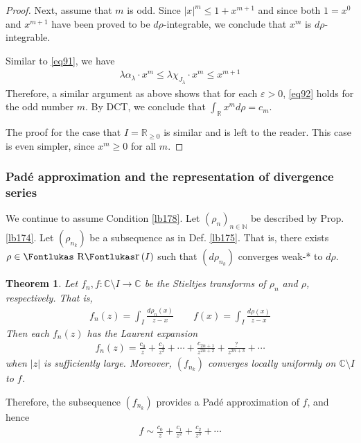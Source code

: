 \documentclass[12pt,b5paper,notitlepage]{article}
\theoremstyle{definition}
\theoremstyle{plain}
\newtheorem{thm}[df]{Theorem}
\DeclareMathOperator{\Rr}{\text{\Fontlukas R}\text{\kern -0pt {\Fontlukas\large r}}\,}
\newcommand{\Cbb}{\mathbb C}
\newcommand{\Nbb}{\mathbb N}
\newcommand{\Rbb}{\mathbb R}
\newcommand{\eps}{\varepsilon}
\numberwithin{equation}{section}
\begin{document}
\begin{proof}
Next, assume that $m$ is odd. Since $|x|^m\leq 1+x^{m+1}$ and since both $1=x^0$ and $x^{m+1}$ have been proved to be $d\rho$-integrable, we conclude that $x^m$ is $d\rho$-integrable.

Similar to \eqref{eq91}, we have
\begin{align*}
\lambda\alpha_\lambda\cdot x^m\leq \lambda\chi_{J_\lambda}\cdot x^m\leq x^{m+1}
\end{align*}
Therefore, a similar argument as above shows that for each $\eps>0$, \eqref{eq92} holds for the odd number $m$. By DCT, we conclude that $\int_\Rbb x^md\rho=c_m$.

The proof for the case that $I=\Rbb_{\geq0}$ is similar and is left to the reader. This case is even simpler, since $x^m\geq0$ for all $m$.
\end{proof}




\subsubsection{Pad\'e approximation and the representation of divergence series}


We continue to assume Condition \ref{lb178}. Let $(\rho_n)_{n\in\Nbb}$ be described by Prop. \ref{lb174}. Let $(\rho_{n_k})$ be a subsequence as in Def. \ref{lb175}. That is, there exists $\rho\in\Rr(I)$ such that $(d\rho_{n_k})$ converges weak-* to $d\rho$.


\begin{thm}\label{lb183}
Let $f_n,f:\Cbb\setminus I\rightarrow\Cbb$ be the Stieltjes transforms of $\rho_n$ and $\rho$, respectively. That is,
\begin{gather*}
f_n(z)=\int_I\frac{d\rho_n(x)}{z-x}\qquad f(x)=\int_I\frac{d\rho(x)}{z-x}
\end{gather*}
Then each $f_n(z)$ has the Laurent expansion
\begin{align}\label{eq99}
f_n(z)=\frac{c_0}{z}+\frac{c_1}{z^2}+\cdots+\frac{c_{2n+1}}{z^{2n+2}}+\frac{?}{z^{2n+3}}+\cdots
\end{align}
when $|z|$ is sufficiently large. Moreover, $(f_{n_k})$ converges locally uniformly on $\Cbb\setminus I$ to $f$.
\end{thm}


Therefore, the subsequence $(f_{n_k})$ provides a Pad\'e approximation of $f$, and hence
\begin{align*}
f\sim \frac{c_0}{z}+\frac{c_1}{z^2}+\frac{c_2}{z^3}+\cdots
\end{align*}
\end{document}
